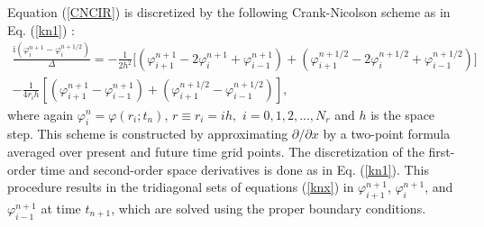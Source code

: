 \documentclass[onecolumn]{elsart3p}
\begin{document}
Equation (\ref{CNCIR}) is discretized by the
following Crank-Nicolson scheme as in Eq.
(\ref{kn1}) \cite{koonin,ames,dtray}:
\begin{align}\label{knx}
\frac{\mbox{i}(\varphi_{i}^{n+1}-
\varphi_{i}^{n+1/2})}{\Delta}=-\frac{1}{2h^2}\biggr[(\varphi^{n+1}_{i+1}-
2\varphi^{n+1}_i
+\varphi^{n+1}_{i-1})
+(\varphi^{n+1/2}_{i+1}-2\varphi_{i}^{n+1/2}
+\varphi^{n+1/2}_{i-1})\biggr]\nonumber \\ -\frac{1}{4r_ih}
\left[(\varphi^{n+1}_{i+1}-\varphi^{n+1}_{i-1})+(\varphi^{n+1/2}_{i+1}-
\varphi^{n+1/2}_{i-1})
\right],
\end{align}
where again
$\varphi_i^n=\varphi(r_i;t_n)$,   $r\equiv r_i=ih,$
$i=0,1,2,...,N_r$  and $h$ is the space step.
This scheme is
constructed by approximating $\partial /\partial x$ by a two-point
formula averaged over  present and  future time grid points.
The discretization of the first-order time and second-order space
derivatives is done as in Eq. (\ref{kn1}).
This
procedure results in the tridiagonal sets of equations
(\ref{knx}) in $\varphi^{n+1}_{i+1}$,  $\varphi^{n+1}_{i}$, and
$\varphi^{n+1}_{i-1}$ at time $t_{n+1}$, which are solved using the
proper boundary conditions.
\end{document}
